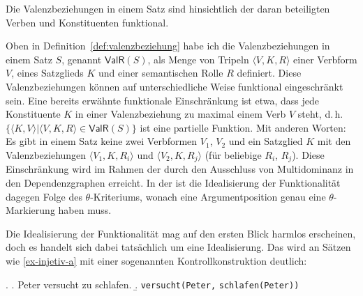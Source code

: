 \begin{idealisierung} 
Die Valenzbeziehungen in einem Satz sind hinsichtlich der daran beteiligten Verben und Konstituenten funktional. 
\end{idealisierung} 
Oben in Definition~\ref{def:valenzbeziehung} habe ich die Valenzbeziehungen in einem Satz $S$, genannt $\mathsf{ValR}(S)$, als Menge von Tripeln $\langle V, K, R \rangle$ einer Verbform $V$, eines Satzglieds $K$ und einer semantischen Rolle $R$ definiert. Diese Valenzbeziehungen können auf unterschiedliche Weise funktional eingeschränkt sein. Eine bereits erwähnte funktionale Einschränkung ist etwa, dass jede Konstituente $K$ in einer Valenzbeziehung zu maximal einem Verb $V$ steht, d.\,h.\ $\{\langle K,V \rangle | \langle V,K,R \rangle \in \mathsf{ValR}(S) \}$ ist eine partielle Funktion. Mit anderen Worten: Es gibt in einem Satz keine zwei Verbformen $V_1$, $V_2$ und ein Satzglied $K$ mit den Valenzbeziehungen $\langle V_1, K, R_i \rangle$ und $\langle V_2, K, R_j\rangle$ (für beliebige $R_i$, $R_j$). Diese Einschränkung wird im Rahmen der  durch den Ausschluss von Multidominanz in den Dependenzgraphen erreicht. In der  ist die Idealisierung der Funktionalität dagegen Folge des $\theta$-Kriteriums, wonach eine Argumentposition genau eine $\theta$-Markierung haben muss.

Die Idealisierung der Funktionalität mag auf den ersten Blick harmlos erscheinen, doch es handelt sich dabei tatsächlich um eine Idealisierung. Das wird an Sätzen wie \ref{ex-injetiv-a} mit einer sogenannten Kontrollkonstruktion deutlich: 

\ex. \label{ex-injetiv} 
\a. \label{ex-injetiv-a} Peter versucht zu schlafen.
\b. \label{ex-injetiv-b} {\tt versucht(Peter,} {\tt schlafen(Peter))}

